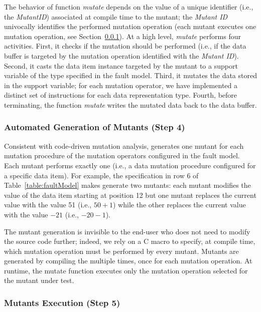 The behavior of function \emph{mutate} depends on the value of a unique identifier (i.e., the \emph{MutantID}) associated at compile time to the mutant; the \emph{Mutant ID} univocally identifies the performed mutation operation (each mutant executes one mutation operation, see Section~\ref{sec:mutantsGeneration}).
At a high level, \emph{mutate} performs four activities. First, it checks if the mutation should be performed (i.e., if the data buffer is targeted by the mutation operation identified with the \emph{Mutant ID}). Second, it casts the data item instance targeted by the mutant to a support variable of the type specified in the fault model. Third, it mutates the data stored in the support variable; for each mutation operator, we have implemented a distinct set of instructions for each data representation type. Fourth, before terminating, the function \emph{mutate} writes the mutated data back to the data buffer.





\subsubsection{Automated Generation of Mutants (Step 4)}
\label{sec:mutantsGeneration}



Consistent with code-driven mutation analysis, \APPR generates one mutant for each mutation procedure of the mutation operators configured in the fault model. Each mutant performs exactly one  (i.e., a data mutation procedure configured for a specific data item). For example, the specification in row 6 of Table~\ref{table:faultModel} makes \APPR generate two mutants: each mutant modifies the value of the data item starting at position 12 but one mutant replaces the current value with the value 51 (i.e., $50+1$) while the other replaces the current value with the value $-21$ (i.e., $-20 -1$).

The mutant generation is invisible to the end-user who does not need to modify the source code further; indeed, we rely on a C macro to specify, at compile time, which mutation operation must be performed by every mutant. Mutants are generated by compiling the  multiple times, once for each mutation operation. At runtime, the mutate function executes only the mutation operation selected for the mutant under test.

\subsubsection{Mutants Execution (Step 5)}
\label{sec:mutantsExecution}

